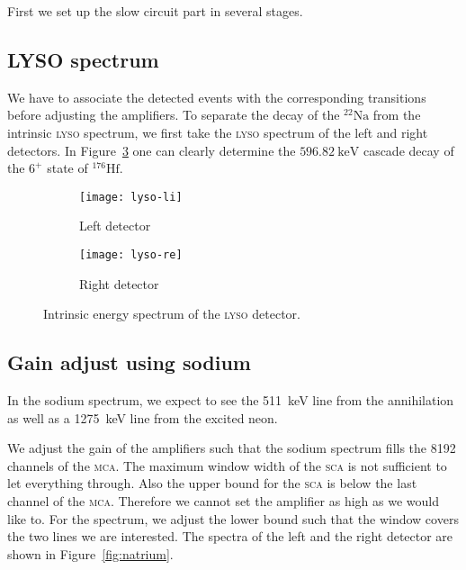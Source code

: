 \documentclass[11pt, english, fleqn, DIV=15, headinclude, BCOR=2cm]{scrreprt}
\begin{document}
First we set up the slow circuit part in several stages.

\subsection{LYSO spectrum}

We have to associate the detected events with the corresponding transitions
before adjusting the amplifiers. To separate the decay of the
${}^{22}\text{Na}$ from the intrinsic \textsc{lyso} spectrum, we first take the
\textsc{lyso} spectrum of the left and right detectors. In
Figure~\ref{fig:lyso} one can clearly determine the
$\SI{596.82}{\kilo\electronvolt}$ cascade decay of the $6^+$ state of
${}^{176}\text{Hf}$.

\begin{figure}
        \centering
        \begin{subfigure}[c]{.49\linewidth}
                \centering
                \texttt{[image: lyso-li]}
                \caption{%
                        Left detector
                }
                \label{fig:lyso-li}
        \end{subfigure}
        \hfill
        \begin{subfigure}[c]{.49\linewidth}
                \centering
                \texttt{[image: lyso-re]}
                \caption{%
                        Right detector
                }
                \label{fig:lyso-re}
        \end{subfigure}
        \caption{%
                Intrinsic energy spectrum of the \textsc{lyso} detector.
        }
        \label{fig:lyso}
\end{figure}

\subsection{Gain adjust using sodium}

In the sodium spectrum, we expect to see the \SI{511}{\kilo\electronvolt} line
from the annihilation as well as a \SI{1275}{\kilo\electronvolt} line from the
excited neon.

We adjust the gain of the amplifiers such that the sodium spectrum fills the
8192 channels of the \textsc{mca}. The maximum window width of the \textsc{sca}
is not sufficient to let everything through. Also the upper bound for the
\textsc{sca} is below the last channel of the \textsc{mca}. Therefore we cannot
set the amplifier as high as we would like to. For the spectrum, we adjust the
lower bound such that the window covers the two lines we are interested. The
spectra of the left and the right detector are shown in
Figure~\ref{fig:natrium}.
\end{document}
